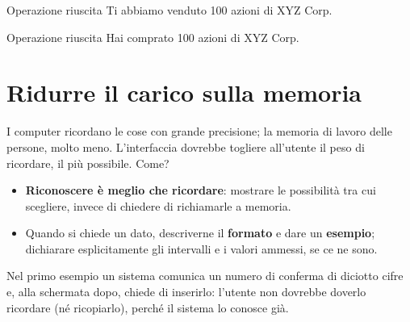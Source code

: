 \begin{center}
\begin{minipage}[t]{0.4\linewidth}\centering
  \begin{finestra}{Operazione riuscita}
    Ti abbiamo venduto 100 azioni di XYZ Corp.
  \end{finestra}\par\smallskip\male
\end{minipage}\hspace{0.06\linewidth}%
\begin{minipage}[t]{0.4\linewidth}\centering
  \begin{finestra}{Operazione riuscita}
    Hai comprato 100 azioni di XYZ Corp.
  \end{finestra}\par\smallskip\bene
\end{minipage}
\end{center}

\section{Ridurre il carico sulla memoria}

I computer ricordano le cose con grande precisione; la memoria di lavoro delle persone, molto meno. L'interfaccia
dovrebbe togliere all'utente il peso di ricordare, il più possibile. Come?

\begin{itemize}
  \item \textbf{Riconoscere è meglio che ricordare}: mostrare le possibilità tra cui scegliere, invece di chiedere di
        richiamarle a memoria.
  \item Quando si chiede un dato, descriverne il \textbf{formato} e dare un \textbf{esempio}; dichiarare esplicitamente
        gli intervalli e i valori ammessi, se ce ne sono.
\end{itemize}

Nel primo esempio un sistema comunica un numero di conferma di diciotto cifre e, alla schermata dopo, chiede di
inserirlo: l'utente non dovrebbe doverlo ricordare (né ricopiarlo), perché il sistema lo conosce già.

